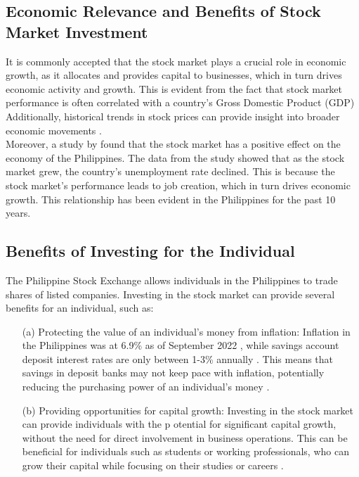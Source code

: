 \subsection{Economic Relevance and Benefits of Stock Market Investment}
It is commonly accepted that the stock market plays a crucial role in economic growth,
 as it allocates and provides capital to businesses, which in turn drives economic
  activity and growth. This is evident from the fact that stock market performance
   is often correlated with a country's Gross Domestic Product (GDP)  
  \cite{TradeBrains, Hall2022, Bae2017}
  Additionally, historical trends in stock prices can provide insight into 
  broader economic movements 
\cite{Campbell2021}.
\\Moreover, a study by  found that the stock market has a 
positive effect on the economy of the Philippines. The data from the study 
showed that as the stock market grew, the country's unemployment rate declined. 
This is because the stock market's performance leads to job creation, which in 
turn drives economic growth. This relationship has been evident in the Philippines 
for the past 10 years.

\subsection{Benefits of Investing for the Individual}
The Philippine Stock Exchange allows individuals in the Philippines
 to trade shares of listed companies. Investing in the stock market can provide 
 several benefits for an individual, such as:
\begin{itemize}
    \item[(a)] Protecting the value of an individual's money from inflation: Inflation 
    in the Philippines was at 6.9\% as of September 2022 
    \cite{tradingEconomics}, 
    while savings account deposit interest rates are only between 1-3\% annually 
    \cite{BSP19}. 
    This means that savings in deposit banks may not keep pace with inflation, 
    potentially reducing the purchasing power of an individual's money 
    \cite{RBC, EdwardJones}.
    \item[(b)] Providing opportunities for capital growth: 
    Investing in the stock market can provide individuals with the p
    otential for significant capital growth, without the need for direct 
    involvement in business operations. This can be beneficial for individuals
    such as students or working professionals, who can grow their capital while 
    focusing on their studies or careers
    \cite{USSecAndExComm}.
\end{itemize}

